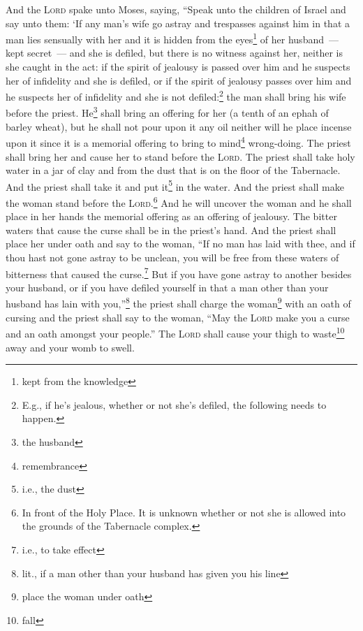 \begin{inparaenum}
     And the \textsc{Lord} spake unto Moses, saying,%
     ``Speak unto the children of Israel and say unto them: `If any man's wife go astray and trespasses against him%
     in that a man lies sensually with her and it is hidden from the eyes\footnote{kept from the knowledge} of her husband~--- kept secret~--- and she is defiled, but there is no witness against her, neither is she caught in the act:%
     if the spirit of jealousy is passed over him and he suspects her of infidelity and she is defiled, or if the spirit of jealousy passes over him and he suspects her of infidelity and she is not defiled:\footnote{E.g., if he's jealous, whether or not she's defiled, the following needs to happen.}%
     the man shall bring his wife before the priest. He\footnote{the husband} shall bring an offering for her (a tenth of an ephah of barley wheat), but he shall not pour upon it any oil neither will he place incense upon it since it is a memorial offering to bring to mind\footnote{remembrance} wrong-doing.%
     The priest shall bring her and cause her to stand before the \textsc{Lord}.%
     The priest shall take holy water in a jar of clay and from the dust that is on the floor of the Tabernacle. And the priest shall take it and put it\footnote{i.e., the dust} in the water.%
     And the priest shall make the woman stand before the \textsc{Lord}.\footnote{In front of the Holy Place. It is unknown whether or not she is allowed into the grounds of the Tabernacle complex.} And he will uncover the woman and he shall place in her hands the memorial offering as an offering of jealousy. The bitter waters that cause the curse shall be in the priest's hand.%
     And the priest shall place her under oath and say to the woman, ``If no man has laid with thee, and if thou hast not gone astray to be unclean, you will be free from these waters of bitterness that caused the curse.\footnote{i.e., to take effect}%
     But if you have gone astray to another besides your husband, or if you have defiled yourself in that a man other than your husband has lain with you,''\footnote{lit., if a man other than your husband has given you his line}%
     the priest shall charge the woman\footnote{place the woman under oath} with an oath of cursing and the priest shall say to the woman, ``May the \textsc{Lord} make you a curse and an oath amongst your people.'' The \textsc{Lord} shall cause your thigh to waste\footnote{fall} away and your womb to swell.%

\end{inparaenum}

